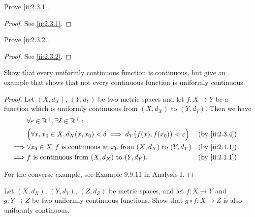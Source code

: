 \exercisesection

\begin{ex}\label{ii:ex:2.3.1}
  Prove \cref{ii:2.3.1}.
\end{ex}

\begin{proof}
  See \cref{ii:2.3.1}.
\end{proof}

\begin{ex}\label{ii:ex:2.3.2}
  Prove \cref{ii:2.3.2}.
\end{ex}

\begin{proof}
  See \cref{ii:2.3.2}.
\end{proof}

\begin{ex}\label{ii:ex:2.3.3}
  Show that every uniformly continuous function is continuous, but give an example that shows that not every continuous function is uniformly continuous.
\end{ex}

\begin{proof}
  Let \((X, d_X)\), \((Y, d_Y)\) be two metric spaces and let \(f : X \to Y\) be a function which is uniformly continuous from \((X, d_X)\) to \((Y, d_Y)\).
  Then we have
  \begin{align*}
             & \forall \varepsilon \in \R^+, \exists \delta \in \R^+ :                                                               \\
             & \Big(\forall x, x_0 \in X, d_X(x, x_0) < \delta \implies d_Y\big(f(x), f(x_0)\big) < \varepsilon\Big) &  & \by{ii:2.3.4} \\
    \implies & \forall x_0 \in X, f \text{ is continuous at } x_0 \text{ from } (X, d_X) \text{ to } (Y, d_Y)        &  & \by{ii:2.1.1} \\
    \implies & f \text{ is continuous from } (X, d_X) \text{ to } (Y, d_Y).                                          &  & \by{ii:2.1.1}
  \end{align*}

  For the converse example, see Example 9.9.11 in Analysis I.
\end{proof}

\begin{ex}\label{ii:ex:2.3.4}
  Let \((X, d_X)\), \((Y, d_Y)\), \((Z, d_Z)\) be metric spaces, and let \(f : X \to Y\) and \(g : Y \to Z\) be two uniformly continuous functions.
  Show that \(g \circ f : X \to Z\) is also uniformly continuous.
\end{ex}

